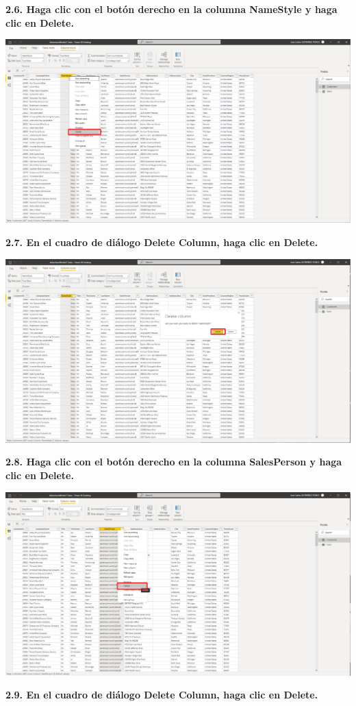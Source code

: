 \documentclass{article}
\begin{document}
\textbf{2.6. Haga clic con el botón derecho en la columna \textbf{NameStyle} y haga clic en \textbf{Delete}.}

    \begin{center}
		\includegraphics[width=14cm]{./images/19} 
	\end{center}
\newpage	
\textbf{2.7. En el cuadro de diálogo \textbf{Delete Column}, haga clic en \textbf{Delete}.}

    \begin{center}
		\includegraphics[width=14cm]{./images/20} 
	\end{center}
	
\textbf{2.8. Haga clic con el botón derecho en la columna \textbf{SalesPerson} y haga clic en \textbf{Delete}.}

    \begin{center}
		\includegraphics[width=14cm]{./images/21} 
	\end{center}
\newpage
\textbf{2.9. En el cuadro de diálogo \textbf{Delete Column}, haga clic en \textbf{Delete}.}
\end{document}
